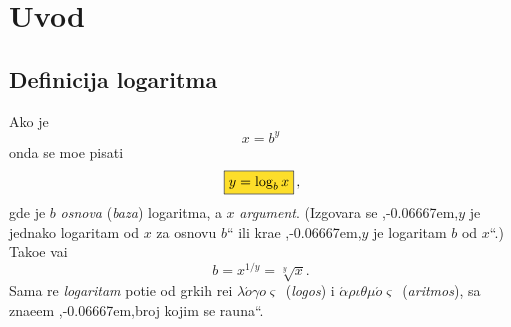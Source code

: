 \documentclass[12pt, twoside, a4paper]{article}
\def\navod#1{\relax,\kern-0.06667em,\relax#1\relax``\relax}
\def\okvir#1{\,\fcolorbox{black}{Goldenrod}{$\displaystyle{\mathstrut #1}$}\,}
\begin{document}


\tableofcontents


\section{Uvod}


\subsection{Definicija logaritma}

Ako je
$$
x=b^y
$$
onda se mo{\zv}e pisati
\begin{equation}
\okvir{y=\log_b x},
\end{equation}
gde je $b$ {\sl osnova\/} ({\sl baza\/}) logaritma, a $x$ {\sl argument}.
(Izgovara se \navod{$y$ je jednako logaritam od $x$ za osnovu $b$}
ili kra{\cc}e \navod{$y$ je logaritam $b$ od $x$}.)
Tako{\dj}e va{\zv}i
$$
b=x^{1/y}=\sqrt[y]x.
$$
Sama re{\cv} {\sl logaritam\/} poti{\cv}e od gr{\cv}kih re{\cv}i 
$\lambda\acute o\gamma o\varsigma$~({\sl logos\/}) i 
$\acute\alpha\rho\iota\theta\mu\acute o\varsigma$~({\sl aritmos\/}), 
sa zna{\cv}e{\nj}em \navod{broj kojim se ra{\cv}una}.
\end{document}
